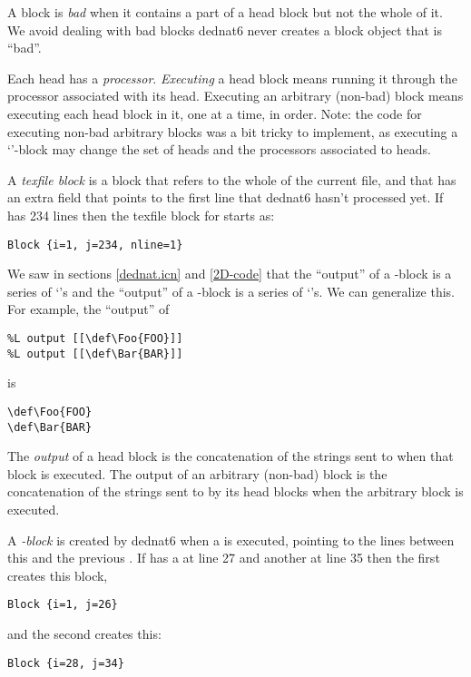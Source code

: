 \documentclass{ltugboat}
\begin{document}
A block is {\sl bad} when it contains a part of a head block but not
the whole of it. We avoid dealing with bad blocks \Dash dednat6 never
creates a block object that is ``bad''.

Each head has a {\sl processor}. {\sl Executing} a head block means
running it through the processor associated with its head. Executing an
arbitrary (non-bad) block means executing each head block in it, one at
a time, in order. Note: the code for executing non-bad arbitrary
blocks was a bit tricky to implement, as executing a `'-block
may change the set of heads and the processors associated to heads.

A {\sl texfile block} is a block that refers to the whole of the
current  file, and that has an extra field  that points
to the first line that dednat6 hasn't processed yet. If  has
234 lines then the texfile block for  starts as:
%
\begin{verbatim}
Block {i=1, j=234, nline=1}
\end{verbatim}

We saw in sections \ref{dednat.icn} and \ref{2D-code} that the
``output'' of a \co{\%:}-block is a series of `'s and the
``output'' of a -block is a series of `'s. We
can generalize this. For example, the ``output'' of
%
\begin{verbatim}
%L output [[\def\Foo{FOO}]]
%L output [[\def\Bar{BAR}]]
\end{verbatim}
%
is
%
\begin{verbatim}
\def\Foo{FOO}
\def\Bar{BAR}
\end{verbatim}

The {\sl output} of a head block is the concatenation of the strings
sent to  when that block is executed. The output of an
arbitrary (non-bad) block is the concatenation of the strings sent to
 by its head blocks when the arbitrary block is executed.

A {\sl \co{\\pu}-block} is created by dednat6 when a \co{\\pu} is
executed, pointing to the lines between this \co{\\pu} and the
previous \co{\\pu}. If  has a \co{\\pu} at line 27 and another
at line 35 then the first \co{\\pu} creates this block,
%
\begin{verbatim}
Block {i=1, j=26}
\end{verbatim}
%
and the second \co{\\pu} creates this:
%
\begin{verbatim}
Block {i=28, j=34}
\end{verbatim}
\end{document}
